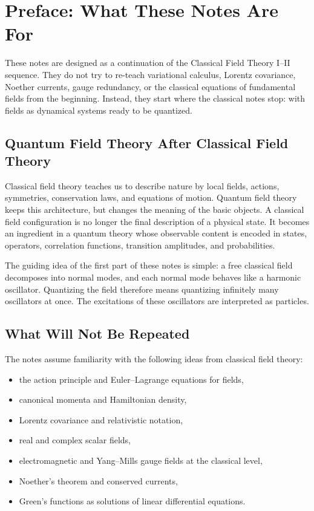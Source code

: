 \chapter*{Preface: What These Notes Are For}

\begin{remarkbox}
These notes are designed as a continuation of the Classical Field Theory I--II
sequence. They do not try to re-teach variational calculus, Lorentz covariance,
Noether currents, gauge redundancy, or the classical equations of fundamental
fields from the beginning. Instead, they start where the classical notes stop:
with fields as dynamical systems ready to be quantized.
\end{remarkbox}

\section*{Quantum Field Theory After Classical Field Theory}

Classical field theory teaches us to describe nature by local fields, actions,
symmetries, conservation laws, and equations of motion. Quantum field theory
keeps this architecture, but changes the meaning of the basic objects. A
classical field configuration is no longer the final description of a physical
state. It becomes an ingredient in a quantum theory whose observable content is
encoded in states, operators, correlation functions, transition amplitudes, and
probabilities.

The guiding idea of the first part of these notes is simple: a free classical
field decomposes into normal modes, and each normal mode behaves like a harmonic
oscillator. Quantizing the field therefore means quantizing infinitely many
oscillators at once. The excitations of these oscillators are interpreted as
particles.

\section*{What Will Not Be Repeated}

The notes assume familiarity with the following ideas from classical field
theory:
\begin{itemize}
    \item the action principle and Euler--Lagrange equations for fields,
    \item canonical momenta and Hamiltonian density,
    \item Lorentz covariance and relativistic notation,
    \item real and complex scalar fields,
    \item electromagnetic and Yang--Mills gauge fields at the classical level,
    \item Noether's theorem and conserved currents,
    \item Green's functions as solutions of linear differential equations.
\end{itemize}

